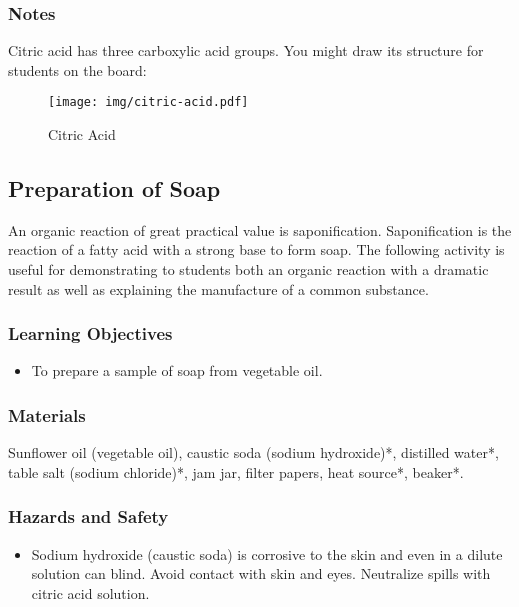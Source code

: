 \subsubsection*{Notes}
Citric acid has three carboxylic acid groups. You might draw its structure for students on the board: 
\begin{center}
\begin{figure}[h]
\begin{center}\texttt{[image: img/citric-acid.pdf]}\end{center}
\caption{Citric Acid}
\end{figure}
\end{center}


\subsection{Preparation of Soap}

An organic reaction of great practical value is saponification. Saponification is the reaction of a fatty acid with a strong base to form soap. The following activity is useful for demonstrating to students both an organic reaction with a dramatic result as well as explaining the manufacture of a common substance.

\subsubsection*{Learning Objectives}
\begin{itemize}
\item{To prepare a sample of soap from vegetable oil.}
\end{itemize}

\subsubsection*{Materials}
Sunflower oil (vegetable oil), caustic soda (sodium hydroxide)*, distilled water*, table salt (sodium chloride)*, jam jar, filter papers, heat source*, beaker*.

\subsubsection*{Hazards and Safety}
\begin{itemize}
\item{Sodium hydroxide (caustic soda) is corrosive to the skin and even in a dilute solution can blind. Avoid contact with skin and eyes. Neutralize spills with citric acid solution.}
\end{itemize}

